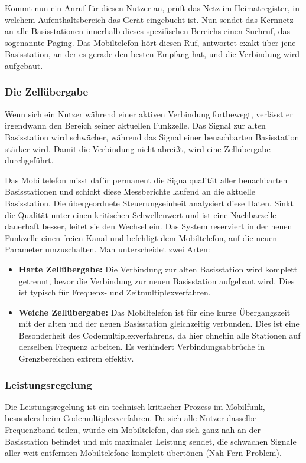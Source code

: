 \documentclass[11pt,a4paper]{article}
\begin{document}
Kommt nun ein Anruf für diesen Nutzer an, prüft das Netz im Heimatregister, in welchem Aufenthaltsbereich das Gerät eingebucht ist. Nun sendet das Kernnetz an alle Basisstationen innerhalb dieses spezifischen Bereichs einen Suchruf, das sogenannte Paging. Das Mobiltelefon hört diesen Ruf, antwortet exakt über jene Basisstation, an der es gerade den besten Empfang hat, und die Verbindung wird aufgebaut.

\subsubsection{Die Zellübergabe}
Wenn sich ein Nutzer während einer aktiven Verbindung fortbewegt, verlässt er irgendwann den Bereich seiner aktuellen Funkzelle. Das Signal zur alten Basisstation wird schwächer, während das Signal einer benachbarten Basisstation stärker wird. Damit die Verbindung nicht abreißt, wird eine Zellübergabe durchgeführt.

Das Mobiltelefon misst dafür permanent die Signalqualität aller benachbarten Basisstationen und schickt diese Messberichte laufend an die aktuelle Basisstation. Die übergeordnete Steuerungseinheit analysiert diese Daten. Sinkt die Qualität unter einen kritischen Schwellenwert und ist eine Nachbarzelle dauerhaft besser, leitet sie den Wechsel ein. Das System reserviert in der neuen Funkzelle einen freien Kanal und befehligt dem Mobiltelefon, auf die neuen Parameter umzuschalten. Man unterscheidet zwei Arten:

\begin{itemize}
    \item \textbf{Harte Zellübergabe:} Die Verbindung zur alten Basisstation wird komplett getrennt, bevor die Verbindung zur neuen Basisstation aufgebaut wird. Dies ist typisch für Frequenz- und Zeitmultiplexverfahren.
    \item \textbf{Weiche Zellübergabe:} Das Mobiltelefon ist für eine kurze Übergangszeit mit der alten und der neuen Basisstation gleichzeitig verbunden. Dies ist eine Besonderheit des Codemultiplexverfahrens, da hier ohnehin alle Stationen auf derselben Frequenz arbeiten. Es verhindert Verbindungsabbrüche in Grenzbereichen extrem effektiv.
\end{itemize}

\subsubsection{Leistungsregelung}
Die Leistungsregelung ist ein technisch kritischer Prozess im Mobilfunk, besonders beim Codemultiplexverfahren. Da sich alle Nutzer dasselbe Frequenzband teilen, würde ein Mobiltelefon, das sich ganz nah an der Basisstation befindet und mit maximaler Leistung sendet, die schwachen Signale aller weit entfernten Mobiltelefone komplett übertönen (Nah-Fern-Problem).
\end{document}
